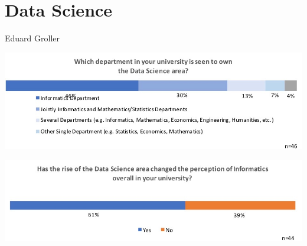 \section{Data Science}

Eduard Groller

\includegraphics[width = \linewidth]{charts/4a.jpg}

\includegraphics[width = \linewidth]{charts/4b.jpg}
